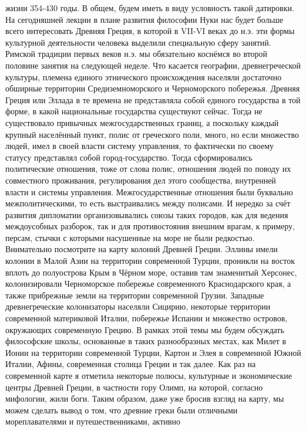 жизни 354-430 годы. В общем, будем иметь в виду условность такой датировки. На
сегодняшней лекции в плане развития философии Нуки нас будет больше всего
интересовать Древняя Греция, в которой в VII-VI веках до н.э. эти формы
культурной деятельности человека выделили специальную сферу занятий. Римской
традиции первых веков н.э. мы обязательно коснёмся во второй половине занятия на
следующей неделе. Что касается географии, древнегреческой культуры, племена
единого этнического происхождения населяли достаточно обширные территории
Средиземноморского и Черноморского побережья. Древняя Греция или Эллада в те
времена не представляла собой единого государства в той форме, в какой
национальные государства существуют сейчас. Тогда не существовало привычных
межгосударственных границ, а поскольку каждый крупный населённый пункт, полис от
греческого поли, много, но если множество людей, имел в своей власти систему
управления, то фактически по своему статусу представлял собой город-государство.
Тогда сформировались политические отношения, тоже от слова полис, отношения
людей по поводу их совместного проживания, регулирования дел этого сообщества,
внутренней власти и системы управления. Межгосударственные отношения были
буквально межполитическими, то есть выстраивались между полисами. И нередко за
счёт развития дипломатии организовывались союзы таких городов, как для ведения
междоусобных разборок, так и для противостояния внешним врагам, к примеру,
персам, стычки с которыми насушенные на море не были редкостью. Внимательно
посмотрите на карту колоний Древней Греции. Эллины имели колонии в Малой Азии на
территории современной Турции, проникли на восток вплоть до полуострова Крым в
Чёрном море, оставив там знаменитый Херсонес, колонизировали Черноморское
побережье современного Краснодарского края, а также прибрежные земли на
территории современной Грузии. Западные древнегреческие колонизаторы населяли
Сицирию, некоторые территории современной материковой Италии, побережье Испании
и множество островов, окружающих современную Грецию. В рамках этой темы мы будем
обсуждать философские школы, основанные в таких разнообразных местах, как Милет
в Ионии на территории современной Турции, Картон и Элея в современной Южной
Италии, Афины, современная столица Греции и так далее. Как раз на современной
карте я отметила некоторые полюсы, культурные и экономические центры Древней
Греции, в частности гору Олимп, на которой, согласно мифологии, жили боги. Таким
образом, даже уже бросив взгляд на карту, мы можем сделать вывод о том, что
древние греки были отличными мореплавателями и путешественниками, активно
